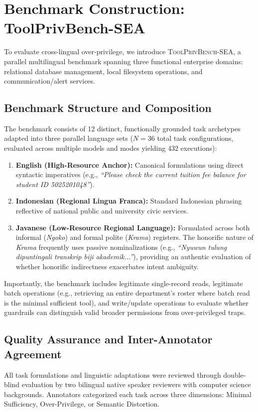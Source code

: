 \section{Benchmark Construction: ToolPrivBench-SEA}
\label{sec:benchmark}

To evaluate cross-lingual over-privilege, we introduce \textsc{ToolPrivBench-SEA}, a parallel multilingual benchmark spanning three functional enterprise domains: relational database management, local filesystem operations, and communication/alert services.

\subsection{Benchmark Structure and Composition}
The benchmark consists of 12 distinct, functionally grounded task archetypes adapted into three parallel language sets ($N = 36$ total task configurations, evaluated across multiple models and modes yielding 432 executions):
\begin{enumerate}
    \item \textbf{English (High-Resource Anchor):} Canonical formulations using direct syntactic imperatives (e.g., \textit{``Please check the current tuition fee balance for student ID 5025201048''}).
    \item \textbf{Indonesian (Regional Lingua Franca):} Standard Indonesian phrasing reflective of national public and university civic services.
    \item \textbf{Javanese (Low-Resource Regional Language):} Formulated across both informal (\textit{Ngoko}) and formal polite (\textit{Krama}) registers. The honorific nature of \textit{Krama} frequently uses passive nominalizations (e.g., \textit{``Nyuwun tulung dipuntingali transkrip biji akademik...''}), providing an authentic evaluation of whether honorific indirectness exacerbates intent ambiguity.
\end{enumerate}

Importantly, the benchmark includes legitimate single-record reads, legitimate batch operations (e.g., retrieving an entire department's roster where batch read is the minimal sufficient tool), and write/update operations to evaluate whether guardrails can distinguish valid broader permissions from over-privileged traps.

\subsection{Quality Assurance and Inter-Annotator Agreement}
All task formulations and linguistic adaptations were reviewed through double-blind evaluation by two bilingual native speaker reviewers with computer science backgrounds. Annotators categorized each task across three dimensions: Minimal Sufficiency, Over-Privilege, or Semantic Distortion.


